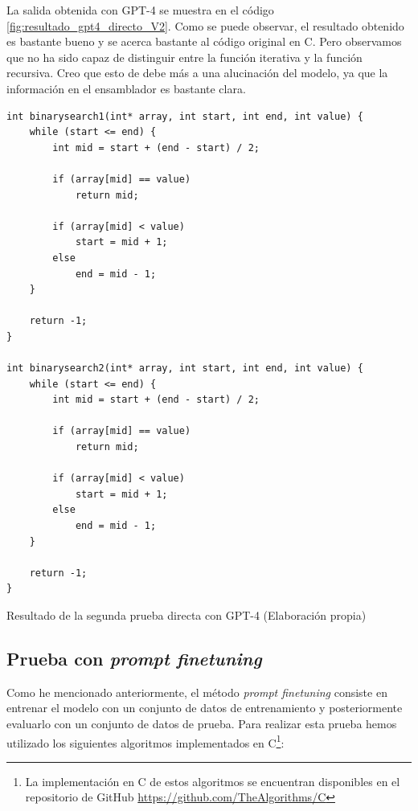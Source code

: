 La salida obtenida con GPT-4 se muestra en el código \ref{fig:resultado_gpt4_directo_V2}.
Como se puede observar, el resultado obtenido es bastante bueno y se acerca bastante al
código original en C. Pero observamos que no ha sido capaz de distinguir entre la función
iterativa y la función recursiva. Creo que esto de debe más a una alucinación del modelo,
ya que la información en el ensamblador es bastante clara.

\begin{mycode}
    \begin{verbatim}
int binarysearch1(int* array, int start, int end, int value) {
    while (start <= end) {
        int mid = start + (end - start) / 2;

        if (array[mid] == value)
            return mid;

        if (array[mid] < value)
            start = mid + 1;
        else
            end = mid - 1;
    }

    return -1;
}

int binarysearch2(int* array, int start, int end, int value) {
    while (start <= end) {
        int mid = start + (end - start) / 2;

        if (array[mid] == value)
            return mid;

        if (array[mid] < value)
            start = mid + 1;
        else
            end = mid - 1;
    }

    return -1;
}       
    \end{verbatim}
    \caption[Resultado de la segunda prueba directa con GPT-4]{Resultado de la segunda prueba directa con GPT-4 (Elaboración propia)}
    \label{cod:resultado_gpt4_directo_V2}
\end{mycode}

\subsection{Prueba con \textit{prompt finetuning}}
\label{subsec:prueba_prompt_finetuning}


Como he mencionado anteriormente, el método \textit{prompt finetuning} consiste en entrenar
el modelo con un conjunto de datos de entrenamiento y posteriormente evaluarlo con un conjunto
de datos de prueba. Para realizar esta prueba hemos utilizado los siguientes algoritmos implementados
en C\footnote{La implementación en C de estos algoritmos se encuentran disponibles en el repositorio de GitHub
\url{https://github.com/TheAlgorithms/C}}:

